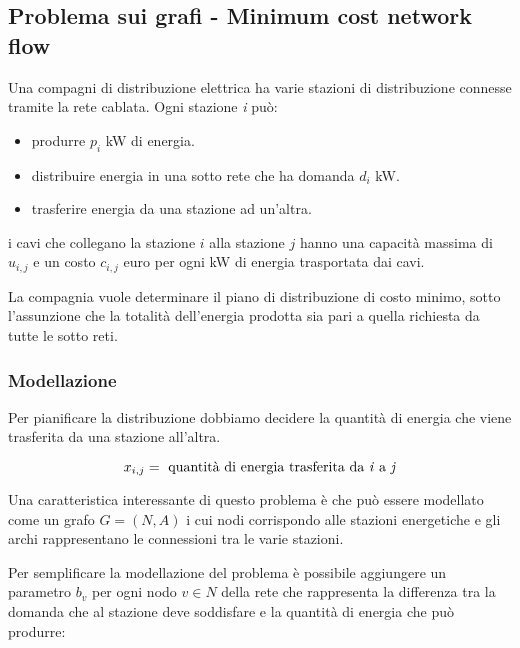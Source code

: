 

\subsection{Problema sui grafi - Minimum cost network flow}

Una compagni di distribuzione elettrica ha varie stazioni di distribuzione connesse tramite la rete cablata. Ogni stazione \textit{i} può:

\begin{itemize}
	\item produrre $p_i$ kW di energia.
	\item distribuire energia in una sotto rete che ha domanda $d_i$ kW.
	\item trasferire energia da una stazione ad un'altra.
\end{itemize}

\noindent i cavi che collegano la stazione $i$ alla stazione $j$ hanno una capacità massima di $u_{i,j}$ e un costo $c_{i,j}$ euro per ogni kW di energia trasportata dai cavi.

La compagnia vuole determinare il piano di distribuzione di costo minimo, sotto l'assunzione che la totalità dell'energia prodotta sia pari a quella richiesta da tutte le sotto reti.

\subsubsection{Modellazione}

Per pianificare la distribuzione dobbiamo decidere la quantità di energia che viene trasferita da una stazione all'altra.

$$
x_{i,j} = \text{ quantità di energia trasferita da \textit{i} a \textit{j}}
$$

\noindent Una caratteristica interessante di questo problema è che può essere modellato come un grafo $G = (N,A)$ i cui nodi corrispondo alle stazioni energetiche e gli archi rappresentano le connessioni tra le varie stazioni.

Per semplificare la modellazione del problema è possibile aggiungere un parametro $b_v$ per ogni nodo $v \in N$ della rete che rappresenta la differenza tra la domanda che al stazione deve soddisfare e la quantità di energia che può produrre:


